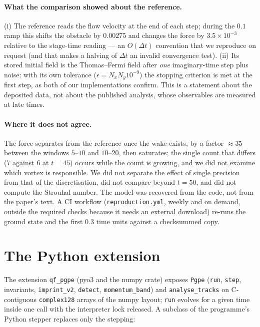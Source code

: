 \documentclass[11pt,a4paper]{article}
\begin{document}
\paragraph{What the comparison showed about the reference.} (i) The reference reads the flow velocity at the end of each step; during the $0.1$ ramp this shifts the obstacle by $0.00275$ and changes the force by $3.5\times10^{-3}$ relative to the stage-time reading --- an $O(\Delta t)$ convention that we reproduce on request (and that makes a halving of $\Delta t$ an invalid convergence test). (ii) Its stored initial field is the Thomas--Fermi field after \emph{one} imaginary-time step plus noise: with its own tolerance ($\epsilon=N_xN_y10^{-9}$) the stopping criterion is met at the first step, as both of our implementations confirm. This is a statement about the deposited data, not about the published analysis, whose observables are measured at late times.
\paragraph{Where it does not agree.} The force separates from the reference once the wake exists, by a factor $\approx35$ between the windows $5$--$10$ and $10$--$20$, then saturates; the single count that differs (7 against 6 at $t=45$) occurs while the count is growing, and we did not examine which vortex is responsible. We did not separate the effect of single precision from that of the discretisation, did not compare beyond $t=50$, and did not compute the Strouhal number. The model was recovered from the code, not from the paper's text.
A CI workflow (\texttt{reproduction.yml}, weekly and on demand, outside the required checks because it needs an external download) re-runs the ground state and the first $0.3$ time units against a checksummed copy.

\section{The Python extension}\label{sec:extension}

The extension \texttt{qf\_pgpe} (pyo3 and the numpy crate) exposes \texttt{Pgpe} (\texttt{run}, \texttt{step}, invariants, \texttt{imprint\_v2}, \texttt{detect}, \texttt{momentum\_band}) and \texttt{analyse\_tracks} on C-contiguous \texttt{complex128} arrays of the numpy layout; \texttt{run} evolves for a given time inside one call with the interpreter lock released.
A subclass of the programme's Python stepper replaces only the stepping:
\end{document}
